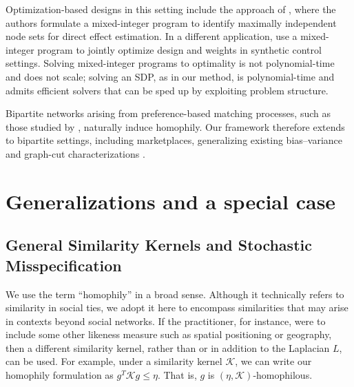 \documentclass[12pt]{article}
\theoremstyle{definition}
\numberwithin{equation}{section}
\numberwithin{figure}{section}
\numberwithin{equation}{section}
\numberwithin{figure}{section}
\begin{document}
Optimization-based designs in this setting include the approach of
\citet{fatemi2023network}, where the authors formulate a mixed-integer program to identify maximally independent node sets for direct effect estimation. In a different application, \citet{doudchenko2021synthetic} use a mixed-integer program to jointly optimize design and weights in synthetic control settings. 
Solving mixed-integer programs to optimality is not polynomial-time and does not scale; solving an SDP, as in our method, is polynomial-time and admits efficient solvers that can be sped up by exploiting problem structure.

Bipartite networks arising from preference-based matching processes, such as those studied by \citet{gale1962college}, naturally induce homophily. Our framework therefore extends to bipartite settings, including marketplaces, generalizing existing bias–variance and graph-cut characterizations \citep{brennan2022cluster, holtz2025reducing, pouget2018optimizing, harshaw2023design}.


\section{Generalizations and a special case} \label{generalization}

\subsection{General Similarity Kernels and Stochastic Misspecification}
\label{general_misspecifications_sim_kernels}

We use the term ``homophily'' in a broad sense. Although it technically refers to similarity in social ties, we adopt it here to encompass similarities that may arise in contexts beyond social networks. 
If the practitioner, for instance, were to include some other likeness measure such as spatial positioning or geography, then a different similarity kernel, rather than or in addition to the Laplacian $L$, can be used. For example, under a similarity kernel $\mathcal{K}$, we can write our homophily formulation as $g^T \mathcal{K} g \leq \eta$. That is, $g$ is $(\eta, \mathcal{K})$-homophilous.
\end{document}
